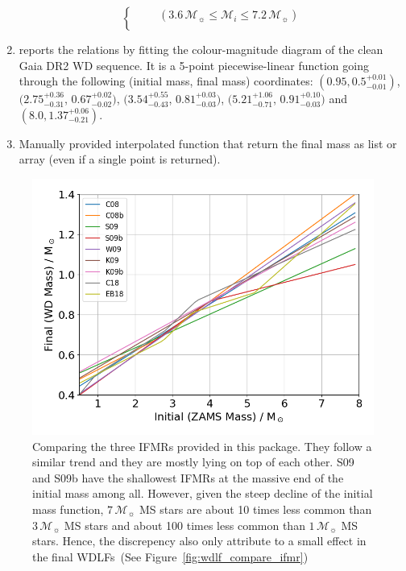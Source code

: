 \documentclass[fleqn,usenatbib]{rasti}
\newcommand{\msun}{\mathcal{M}_{\sun}}
\begin{document}
\begin{enumerate}
\begin{equation}
\begin{cases}
                  \qquad(3.6\,\msun \leq \mathcal{M}_i \leq 7.2\,\msun)\\
              \end{cases}
    \end{equation}
    \item \citet{2018ApJ...860L..17E} reports the relations by fitting the colour-magnitude diagram of the clean Gaia DR2 WD sequence. It is a 5-point piecewise-linear function going through the following (initial mass, final mass) coordinates: $(0.95, 0.5^{+0.01}_{-0.01})$, $(2.75^{+0.36}_{-0.31}$, $0.67^{+0.02}_{-0.02})$, $(3.54^{+0.55}_{-0.43}$, $0.81^{+0.03}_{-0.03})$, $(5.21^{+1.06}_{-0.71}$, $0.91^{+0.10}_{-0.03})$ and $(8.0, 1.37^{+0.06}_{-0.21})$.
    \item Manually provided interpolated function that return the final mass as list or array (even if a single point is returned).
\end{enumerate}

\begin{figure}
    \centering
    \includegraphics[width=\columnwidth]{ifmrs.png}
    \caption{Comparing the three IFMRs provided in this package. They follow
    a similar trend and they are mostly lying on top of each other. S09 and S09b
    have the shallowest IFMRs at the massive end of the initial mass among all.
    However, given the steep decline of the initial mass function, $7\,\msun$
    MS stars are about 10 times less common than $3\,\msun$ MS stars and about
    100 times less common than $1\,\msun$ MS stars. Hence, the discrepency also
    only attribute to a small effect in the final WDLFs~(See
    Figure~\ref{fig:wdlf_compare_ifmr})}
    \label{fig:ifmrs}
\end{figure}
\end{document}
